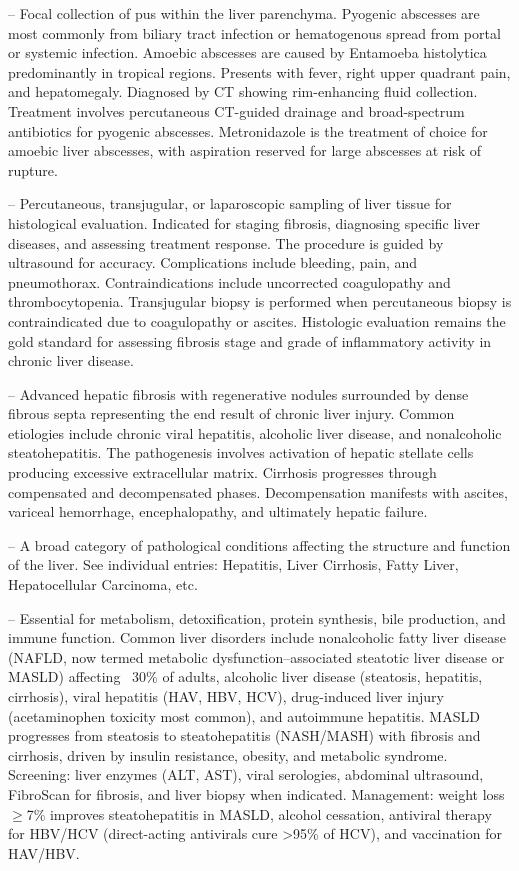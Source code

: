 -- Focal collection of pus within the liver parenchyma. Pyogenic abscesses are most commonly from biliary tract infection or hematogenous spread from portal or systemic infection. Amoebic abscesses are caused by Entamoeba histolytica predominantly in tropical regions. Presents with fever, right upper quadrant pain, and hepatomegaly. Diagnosed by CT showing rim-enhancing fluid collection. Treatment involves percutaneous CT-guided drainage and broad-spectrum antibiotics for pyogenic abscesses. Metronidazole is the treatment of choice for amoebic liver abscesses, with aspiration reserved for large abscesses at risk of rupture.

-- Percutaneous, transjugular, or laparoscopic sampling of liver tissue for histological evaluation. Indicated for staging fibrosis, diagnosing specific liver diseases, and assessing treatment response. The procedure is guided by ultrasound for accuracy. Complications include bleeding, pain, and pneumothorax. Contraindications include uncorrected coagulopathy and thrombocytopenia. Transjugular biopsy is performed when percutaneous biopsy is contraindicated due to coagulopathy or ascites. Histologic evaluation remains the gold standard for assessing fibrosis stage and grade of inflammatory activity in chronic liver disease.

-- Advanced hepatic fibrosis with regenerative nodules surrounded by dense fibrous septa representing the end result of chronic liver injury. Common etiologies include chronic viral hepatitis, alcoholic liver disease, and nonalcoholic steatohepatitis. The pathogenesis involves activation of hepatic stellate cells producing excessive extracellular matrix. Cirrhosis progresses through compensated and decompensated phases. Decompensation manifests with ascites, variceal hemorrhage, encephalopathy, and ultimately hepatic failure.

-- A broad category of pathological conditions affecting the structure and function of the liver. See individual entries: Hepatitis, Liver Cirrhosis, Fatty Liver, Hepatocellular Carcinoma, etc.

-- Essential for metabolism, detoxification, protein synthesis, bile production, and immune function. Common liver disorders include nonalcoholic fatty liver disease (NAFLD, now termed metabolic dysfunction--associated steatotic liver disease or MASLD) affecting ~30\% of adults, alcoholic liver disease (steatosis, hepatitis, cirrhosis), viral hepatitis (HAV, HBV, HCV), drug-induced liver injury (acetaminophen toxicity most common), and autoimmune hepatitis. MASLD progresses from steatosis to steatohepatitis (NASH/MASH) with fibrosis and cirrhosis, driven by insulin resistance, obesity, and metabolic syndrome. Screening: liver enzymes (ALT, AST), viral serologies, abdominal ultrasound, FibroScan for fibrosis, and liver biopsy when indicated. Management: weight loss $\ge$7\% improves steatohepatitis in MASLD, alcohol cessation, antiviral therapy for HBV/HCV (direct-acting antivirals cure >95\% of HCV), and vaccination for HAV/HBV.

